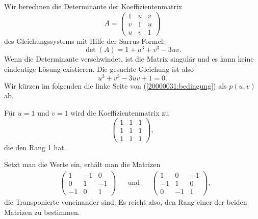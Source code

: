 \begin{loesung}
\begin{teilaufgaben}
\item
Wir berechnen die Determinante der Koeffizientenmatrix
\[
A=\begin{pmatrix}
1&u&v\\
v&1&u\\
u&v&1
\end{pmatrix}
\]
des Gleichungssystems mit Hilfe der Sarrus-Formel:
\[
\det(A)
=
1+u^3+v^3-3uv.
\]
Wenn die Determinante verschwindet, ist die Matrix singulär und es kann
keine eindeutige Lösung existieren.
Die gesuchte Gleichung ist also
\begin{equation}
u^3+v^3-3uv+1=0.
\label{20000031:bedingung}
\end{equation}
Wir kürzen im folgenden die linke Seite von (\ref{20000031:bedingung})
als $p(u,v)$ ab.
\item
Für $u=1$ und $v=1$ wird die Koeffizientenmatrix zu
\[
\begin{pmatrix}
1&1&1\\
1&1&1\\
1&1&1
\end{pmatrix},
\]
die den Rang 1 hat.
\item
Setzt man die Werte ein, erhält man die Matrizen
\begin{align*}
&\begin{pmatrix}
1&-1&0\\
0&1&-1\\
-1&0&1
\end{pmatrix}
&
&\text{und}&
&\begin{pmatrix}
1&0&-1\\
-1&1&0\\
0&-1&1
\end{pmatrix},
\end{align*}
die Transponierte voneinander sind.
Es reicht also, den Rang einer der beiden Matrizen zu bestimmen.


\end{teilaufgaben}
\end{loesung}
